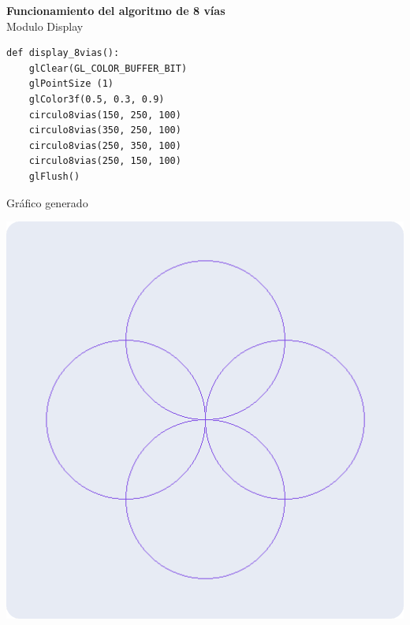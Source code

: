 \documentclass[a4paper]{article}
\begin{document}
\Large{\textbf{Funcionamiento del algoritmo de 8 vías}}\\[0.5cm]
Modulo Display 
\begin{center}
\begin{mycodebox}
\begin{lstlisting}
def display_8vias():
    glClear(GL_COLOR_BUFFER_BIT)
    glPointSize (1)
    glColor3f(0.5, 0.3, 0.9) 
    circulo8vias(150, 250, 100)
    circulo8vias(350, 250, 100)
    circulo8vias(250, 350, 100)
    circulo8vias(250, 150, 100)
    glFlush()
\end{lstlisting}
\end{mycodebox}
\end{center}
Gráfico generado
\begin{center}
\includegraphics[width=15cm]{src/8vias.png}\\
\end{center}
\newpage
\end{document}

